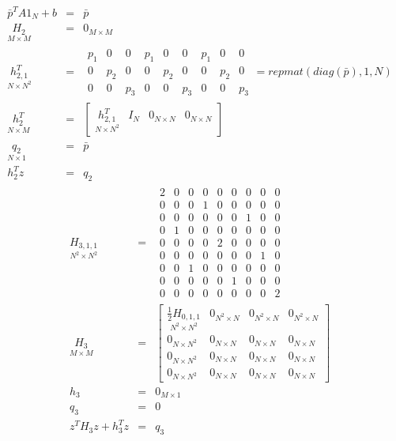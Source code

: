 \documentclass{article}
\begin{document}
\begin{eqnarray*}
\bar{p}^{T}A1_{N}+b &=&\bar{p} \\
\underset{M\times M}{H_{2}} &=&0_{M\times M} \\
\underset{N\times N^{2}}{h_{2,1}^{T}} &=&%
\begin{array}{ccccccccc}
p_{1} & 0 & 0 & p_{1} & 0 & 0 & p_{1} & 0 & 0 \\ 
0 & p_{2} & 0 & 0 & p_{2} & 0 & 0 & p_{2} & 0 \\ 
0 & 0 & p_{3} & 0 & 0 & p_{3} & 0 & 0 & p_{3}%
\end{array}%
=repmat(diag(\bar{p}),1,N) \\
\underset{N\times M}{h_{2}^{T}} &=&\left[ 
\begin{array}{cccc}
\underset{N\times N^{2}}{h_{2,1}^{T}} & I_{N} & 0_{N\times N} & 0_{N\times N}%
\end{array}%
\right]  \\
\underset{N\times 1}{q_{2}} &=&\bar{p} \\
h_{2}^{T}z &=&q_{2}
\end{eqnarray*}%
\begin{eqnarray*}
\underset{N^{2}\times N^{2}}{H_{3,1,1}} &=&%
\begin{array}{ccccccccc}
2 & 0 & 0 & 0 & 0 & 0 & 0 & 0 & 0 \\ 
0 & 0 & 0 & 1 & 0 & 0 & 0 & 0 & 0 \\ 
0 & 0 & 0 & 0 & 0 & 0 & 1 & 0 & 0 \\ 
0 & 1 & 0 & 0 & 0 & 0 & 0 & 0 & 0 \\ 
0 & 0 & 0 & 0 & 2 & 0 & 0 & 0 & 0 \\ 
0 & 0 & 0 & 0 & 0 & 0 & 0 & 1 & 0 \\ 
0 & 0 & 1 & 0 & 0 & 0 & 0 & 0 & 0 \\ 
0 & 0 & 0 & 0 & 0 & 1 & 0 & 0 & 0 \\ 
0 & 0 & 0 & 0 & 0 & 0 & 0 & 0 & 2%
\end{array}
\\
\underset{M\times M}{H_{3}} &=&\left[ 
\begin{array}{cccc}
\underset{N^{2}\times N^{2}}{\frac{1}{2}H_{0,1,1}} & 0_{N^{2}\times N} & 
0_{N^{2}\times N} & 0_{N^{2}\times N} \\ 
0_{N\times N^{2}} & 0_{N\times N} & 0_{N\times N} & 0_{N\times N} \\ 
0_{N\times N^{2}} & 0_{N\times N} & 0_{N\times N} & 0_{N\times N} \\ 
0_{N\times N^{2}} & 0_{N\times N} & 0_{N\times N} & 0_{N\times N}%
\end{array}%
\right]  \\
h_{3} &=&0_{M\times 1} \\
q_{3} &=&0 \\
z^{T}H_{3}z+h_{3}^{T}z &=&q_{3}
\end{eqnarray*}%
\end{document}
